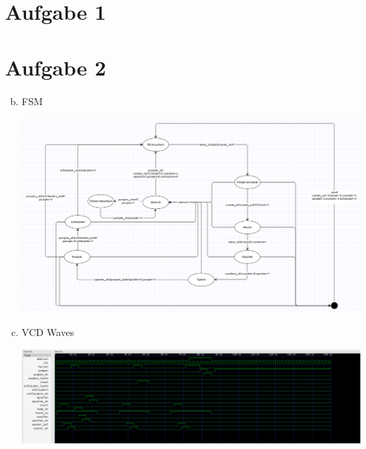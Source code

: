 \documentclass[a4paper]{scrartcl}
\begin{document}
	
	\section*{Aufgabe 1}
	
	
	\section*{Aufgabe 2}
	\begin{enumerate}[(a)]
		\setcounter{enumi}{1}
		\item FSM
		
		\includegraphics[width = 1.0\textwidth]{waschmaschine_fsm}
		\item VCD Waves
		
		\includegraphics[width = 1.0\textwidth]{wave}
		
	\end{enumerate}
	
\end{document}
